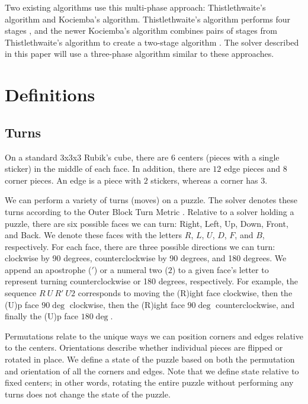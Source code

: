 \documentclass{article}
\begin{document}
Two existing algorithms use this multi-phase approach: Thistlethwaite's algorithm and Kociemba's algorithm. Thistlethwaite's algorithm performs four stages \cite{thistle}, and the newer Kociemba's algorithm combines pairs of stages from Thistlethwaite's algorithm to create a two-stage algorithm \cite{kociemba-2phase}. The solver described in this paper will use a three-phase algorithm similar to these approaches. %


\section{Definitions}

\subsection{Turns}
On a standard 3x3x3 Rubik's cube, there are $6$ centers (pieces with a single sticker) in the middle of each face. In addition, there are $12$ edge pieces and $8$ corner pieces. An edge is a piece with $2$ stickers, whereas a corner has $3$.

We can perform a variety of turns (moves) on a puzzle. The solver denotes these turns according to the Outer Block Turn Metric \cite{wca-regs}. Relative to a solver holding a puzzle, there are six possible faces we can turn: Right, Left, Up, Down, Front, and Back. We denote these faces with the letters $R$, $L$, $U$, $D$, $F$, and $B$, respectively. For each face, there are three possible directions we can turn: clockwise by 90 degrees, counterclockwise by 90 degrees, and 180 degrees. We append an apostrophe ($'$) or a numeral two ($2$) to a given face's letter to represent turning counterclockwise or 180 degrees, respectively. For example, the sequence $R\ U\ R'\ U2$ corresponds to moving the (R)ight face clockwise, then the (U)p face $90 \deg$ clockwise, then the (R)ight face $90 \deg$ counterclockwise, and finally the (U)p face $180 \deg$.

Permutations relate to the unique ways we can position corners and edges relative to the centers. Orientations describe whether individual pieces are flipped or rotated in place. We define a state of the puzzle based on both the permutation and orientation of all the corners and edges. Note that we define state relative to fixed centers; in other words, rotating the entire puzzle without performing any turns does not change the state of the puzzle.
\end{document}
